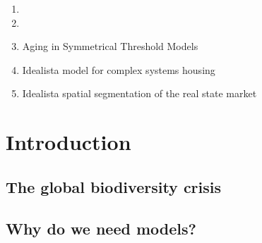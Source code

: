 \documentclass[
	10pt, %
	fleqn, %
	a4paper, %
]{LegrandOrangeBook}
\begin{document}
\begin{enumerate}
	\item {}
	      \vspace{0.5 cm}
	\item {}
	      \vspace{0.5 cm}
	\item Aging in Symmetrical Threshold Models
	      \vspace{0.5 cm}
	\item Idealista model for complex systems housing
	      \vspace{0.5 cm}
	\item Idealista spatial segmentation of the real state market
	      \vspace{0.5 cm}
\end{enumerate}


\part{Introduction}

\chapterspaceabove{6.75cm}
\chapterspacebelow{7.25cm}

\chapter{The global biodiversity crisis}
%

\chapterspaceabove{6.75cm}
\chapterspacebelow{7.25cm}

\chapter{Why do we need models?}
%

\chapterspaceabove{6.75cm}
\chapterspacebelow{7.25cm}
\end{document}
